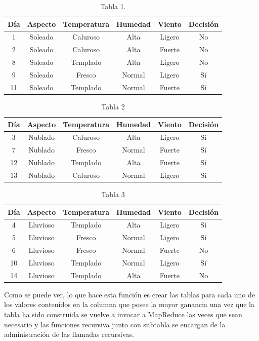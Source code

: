 \begin{table}[H]
	\begin{center}
		\label{tab:tablaInduccionID3}
		\begin{tabular}{c|c|c|c|c|c}
			\textbf{Día} & \textbf{Aspecto} & \textbf{Temperatura} & \textbf{Humedad} & \textbf{Viento} & \textbf{Decisión}\\
			\hline
			1 & Soleado & Caluroso & Alta & Ligero & No\\
			2 & Soleado & Caluroso & Alta & Fuerte & No\\
			8 & Soleado & Templado & Alta & Ligero & No\\
			9 & Soleado & Fresco & Normal & Ligero & Sí\\
			11 & Soleado & Templado & Normal & Fuerte & Sí\\
		\end{tabular}
	\end{center}
	\caption{Tabla 1.}
\end{table}
\begin{table}[H]
	\begin{center}
		\label{tab:tablaInduccionID3}
		\begin{tabular}{c|c|c|c|c|c}
			\textbf{Día} & \textbf{Aspecto} & \textbf{Temperatura} & \textbf{Humedad} & \textbf{Viento} & \textbf{Decisión}\\
			\hline
			3 & Nublado & Caluroso & Alta & Ligero & Sí\\
			7 & Nublado & Fresco & Normal & Fuerte & Sí\\
			12 & Nublado & Templado & Alta & Fuerte & Sí\\
			13 & Nublado & Caluroso & Normal & Ligero & Sí\\
		\end{tabular}
	\end{center}
	\caption{Tabla 2}
\end{table}
\begin{table}[H]
	\begin{center}
		\label{tab:tablaInduccionID3}
		\begin{tabular}{c|c|c|c|c|c}
			\textbf{Día} & \textbf{Aspecto} & \textbf{Temperatura} & \textbf{Humedad} & \textbf{Viento} & \textbf{Decisión}\\
			\hline
			4 & Lluvioso & Templado & Alta & Ligero & Sí\\
			5 & Lluvioso & Fresco & Normal & Ligero & Sí\\
			6 & Lluvioso & Fresco & Normal & Fuerte & No\\
			10 & Lluvioso & Templado & Normal & Ligero & Sí\\
			14 & Lluvioso & Templado & Alta & Fuerte & No\\
		\end{tabular}
	\end{center}
	\caption{Tabla 3}
\end{table}
Como se puede ver, lo que hace esta función es crear las tablas para cada uno de los valores contenidos en la columna que posee la mayor ganancia una vez que la tabla ha sido construida se vuelve a invocar a MapReduce las veces que sean necesario y las funciones recursiva junto con subtabla se encargan de la administración de las llamadas recursivas.
